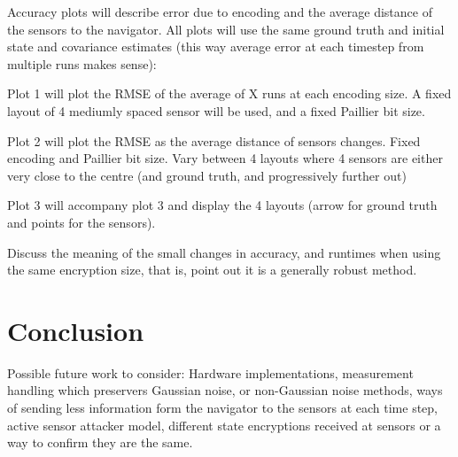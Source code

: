 \documentclass[twocolumn]{autart}
\begin{document}
Accuracy plots will describe error due to encoding and the average distance of the sensors to the navigator. All plots will use the same ground truth and initial state and covariance estimates (this way average error at each timestep from multiple runs makes sense):

Plot 1 will plot the RMSE of the average of X runs at each encoding size. A fixed layout of 4 mediumly spaced sensor will be used, and a fixed Paillier bit size.

Plot 2 will plot the RMSE as the average distance of sensors changes. Fixed encoding and Paillier bit size. Vary between 4 layouts where 4 sensors are either very close to the centre (and ground truth, and progressively further out)

Plot 3 will accompany plot 3 and display the 4 layouts (arrow for ground truth and points for the sensors).

Discuss the meaning of the small changes in accuracy, and runtimes when using the same encryption size, that is, point out it is a generally robust method.

% 
%                                       
%                                       
%                                       
% 

\section{Conclusion} \label{sec:conclusion}
Possible future work to consider: Hardware implementations, measurement handling which preservers Gaussian noise, or non-Gaussian noise methods, ways of sending less information form the navigator to the sensors at each time step, active sensor attacker model, different state encryptions received at sensors or a way to confirm they are the same.



\end{document}

